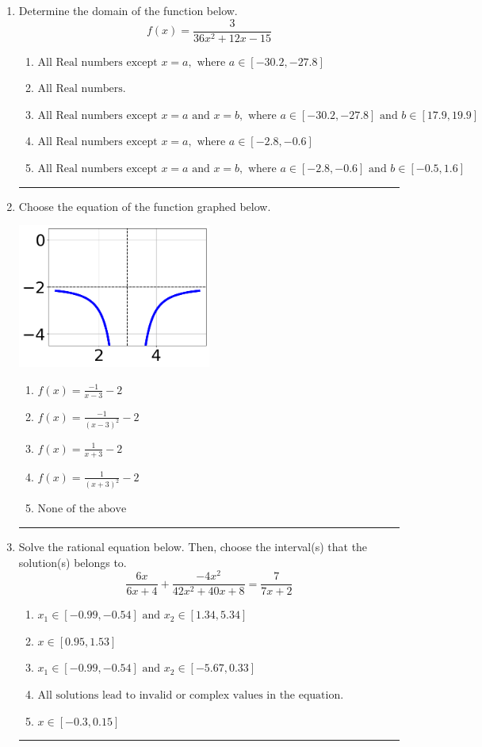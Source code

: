 \documentclass[14pt]{extbook}
\newcommand{\litem}[1]{\item#1\hspace*{-1cm}\rule{\textwidth}{0.4pt}}
\begin{document}
\begin{enumerate}
\litem{
Determine the domain of the function below.\[ f(x) = \frac{3}{36x^{2} +12 x -15} \]\begin{enumerate}[label=\Alph*.]
\item \( \text{All Real numbers except } x = a, \text{ where } a \in [-30.2, -27.8] \)
\item \( \text{All Real numbers.} \)
\item \( \text{All Real numbers except } x = a \text{ and } x = b, \text{ where } a \in [-30.2, -27.8] \text{ and } b \in [17.9, 19.9] \)
\item \( \text{All Real numbers except } x = a, \text{ where } a \in [-2.8, -0.6] \)
\item \( \text{All Real numbers except } x = a \text{ and } x = b, \text{ where } a \in [-2.8, -0.6] \text{ and } b \in [-0.5, 1.6] \)

\end{enumerate} }
\litem{
Choose the equation of the function graphed below.
\begin{center}
    \includegraphics[width=0.5\textwidth]{../Figures/rationalGraphToEquationA.png}
\end{center}
\begin{enumerate}[label=\Alph*.]
\item \( f(x) = \frac{-1}{x - 3} - 2 \)
\item \( f(x) = \frac{-1}{(x - 3)^2} - 2 \)
\item \( f(x) = \frac{1}{x + 3} - 2 \)
\item \( f(x) = \frac{1}{(x + 3)^2} - 2 \)
\item \( \text{None of the above} \)

\end{enumerate} }
\litem{
Solve the rational equation below. Then, choose the interval(s) that the solution(s) belongs to.\[ \frac{6x}{6x + 4} + \frac{-4x^{2}}{42x^{2} +40 x + 8} = \frac{7}{7x + 2} \]\begin{enumerate}[label=\Alph*.]
\item \( x_1 \in [-0.99, -0.54] \text{ and } x_2 \in [1.34,5.34] \)
\item \( x \in [0.95,1.53] \)
\item \( x_1 \in [-0.99, -0.54] \text{ and } x_2 \in [-5.67,0.33] \)
\item \( \text{All solutions lead to invalid or complex values in the equation.} \)
\item \( x \in [-0.3,0.15] \)


\end{enumerate}}
\end{enumerate}
\end{document}
